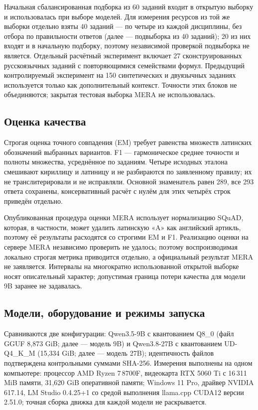 \documentclass[14pt,a4paper]{extarticle}
\begin{document}
Начальная сбалансированная подборка из 60 заданий входит в открытую выборку и использовалась при выборе моделей. Для измерения ресурсов из той же выборки отдельно взяты 40 заданий — по четыре из каждой дисциплины, без отбора по правильности ответов (далее — подвыборка из 40 заданий); 20 из них входят и в начальную подборку, поэтому независимой проверкой подвыборка не является. Отдельный расчётный эксперимент включает 27 сконструированных русскоязычных заданий с повторяющимися семействами формул. Предыдущий контролируемый эксперимент на 150 синтетических и двуязычных заданиях используется только как дополнительный контекст. Точности этих блоков не объединяются; закрытая тестовая выборка MERA не использовалась.

\subsection*{Оценка качества}
Строгая оценка точного совпадения (EM) требует равенства множеств латинских обозначений выбранных вариантов. F1 — гармоническое среднее точности и полноты множества, усреднённое по заданиям. Четыре исходных эталона смешивают кириллицу и латиницу и не разбираются по заявленному правилу; их не транслитерировали и не исправляли. Основной знаменатель равен 289, все 293 ответа сохранены, консервативный расчёт с нулём для этих четырёх строк приведён отдельно.

Опубликованная процедура оценки MERA использует нормализацию SQuAD, которая, в частности, может удалить латинскую «A» как английский артикль, поэтому её результаты расходятся со строгими EM и F1. Реализацию оценки на сервере MERA независимо проверить не удалось; поэтому воспроизводимая локально строгая метрика приводится отдельно, а официальный результат MERA не заявляется. Интервалы на многократно использованной открытой выборке носят описательный характер; допустимая граница потери качества для модели 9B заранее не задавалась.

\subsection*{Модели, оборудование и режимы запуска}
Сравниваются две конфигурации: Qwen3.5-9B с квантованием Q8\_0 (файл GGUF 8,873 GiB; далее — модель 9B) и Qwen3.8-27B с квантованием UD-Q4\_K\_M (15,334 GiB; далее — модель 27B); идентичность файлов подтверждена контрольными суммами SHA-256. Измерения выполнены на одном компьютере: процессор AMD Ryzen 7\,8700F, видеокарта RTX 5060 Ti с 16\,311 MiB памяти, 31,620 GiB оперативной памяти; Windows 11 Pro, драйвер NVIDIA 617.14, LM Studio 0.4.25+1 со средой выполнения llama.cpp CUDA12 версии 2.51.0; точная сборка движка для каждой модели не раскрывается.
\end{document}
